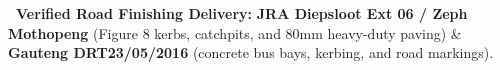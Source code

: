 \vfill

\noindent
\begin{tcolorbox}[enhanced, colback=white, colframe=mhnavy, boxrule=0.8pt, arc=3pt, left=8pt, right=8pt, top=6pt, bottom=6pt, drop shadow=black!3]
    {\fontsize{8pt}{10.6pt}\selectfont\color{mhnavy}\bfseries\faCheckCircle\ Verified Road Finishing Delivery:}\quad
    {\fontsize{8pt}{10.6pt}\selectfont\color{mhtext}
    \textbf{JRA Diepsloot Ext 06 / Zeph Mothopeng} (Figure 8 kerbs, catchpits, and 80mm heavy-duty paving) \& \textbf{Gauteng DRT23/05/2016} (concrete bus bays, kerbing, and road markings).
    }
\end{tcolorbox}

\clearpage
